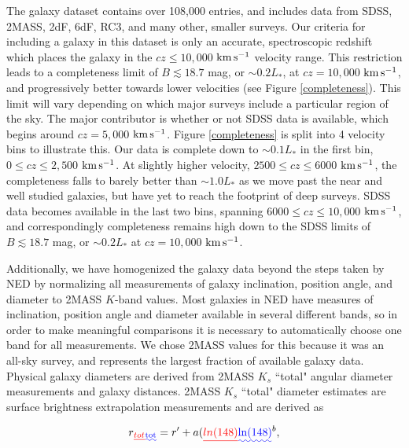 \documentclass[twocolumn,tighten]{aastex6}
\providecommand{\DIFadd}[1]{{\protect\color{blue}\uwave{#1}}} %
\providecommand{\DIFdel}[1]{{\protect\color{red}\sout{#1}}}                      %
\providecommand{\DIFaddbegin}{} %
\providecommand{\DIFaddend}{} %
\providecommand{\DIFdelbegin}{} %
\providecommand{\DIFdelend}{} %
\begin{document}
The galaxy dataset contains over 108,000 entries, and includes data from SDSS, 2MASS, 2dF, 6dF, RC3, and many other, smaller surveys. Our criteria for including a galaxy in this dataset is only an accurate, spectroscopic redshift which places the galaxy in the $cz \leq 10,000$ $\rm km\, s^{-1}$ velocity range. This restriction leads to a completeness limit of $B \lesssim 18.7$ mag, or $\sim0.2 L_*$, at $cz = 10,000$ $\rm km\, s^{-1}$, and progressively better towards lower velocities (see Figure \ref{completeness}). This limit will vary depending on which major surveys include a particular region of the sky. The major contributor is whether or not SDSS data is available, which begins around $cz = 5,000$ $\rm km\, s^{-1}$. Figure \ref{completeness} is split into 4 velocity bins to illustrate this. Our data is complete down to $\sim0.1 L_*$ in the first bin, $0 \leq cz \leq 2,500$ $\rm km\, s^{-1}$. At slightly higher velocity, $2500 \leq cz \leq 6000$ $\rm km\, s^{-1}$, the completeness falls to barely better than $\sim1.0 L_*$ as we move past the near and well studied galaxies, but have yet to reach the footprint of deep surveys. SDSS data becomes available in the last two bins, spanning $6000 \leq cz \leq 10,000$ $\rm km\, s^{-1}$, and correspondingly completeness remains high down to the SDSS limits of $B \lesssim 18.7$ mag, or $\sim0.2 L_*$ at $cz = 10,000$ $\rm km\, s^{-1}$.

Additionally, we have homogenized the galaxy data beyond the steps taken by NED by normalizing all measurements of galaxy inclination, position angle, and diameter to 2MASS $K$-band values. Most galaxies in NED have measures of inclination, position angle and diameter available in several different bands, so in order to make meaningful comparisons it is necessary to automatically choose one band for all measurements. We chose 2MASS values for this because it was an all-sky survey, and represents the largest fraction of available galaxy data. Physical galaxy diameters are derived from 2MASS \DIFdelbegin \DIFdel{$K_s$ }\DIFdelend \DIFaddbegin \DIFadd{$K_{s}$ }\DIFaddend ``total" angular diameter measurements and galaxy distances. 2MASS \DIFdelbegin \DIFdel{$K_s$ }\DIFdelend \DIFaddbegin \DIFadd{$K_{s}$ }\DIFaddend ``total" diameter estimates are surface brightness extrapolation measurements and are derived as 

\begin{equation}
r\DIFdelbegin \DIFdel{_{tot} }\DIFdelend \DIFaddbegin \DIFadd{_{\rm tot} }\DIFaddend = r' + a(\DIFdelbegin \DIFdel{ln(148)}\DIFdelend \DIFaddbegin \DIFadd{\ln(148)}\DIFaddend ^b,
\end{equation}
\end{document}
